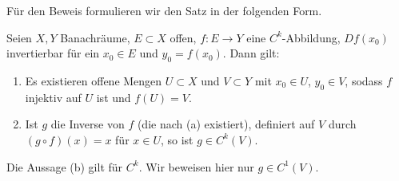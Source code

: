 \documentclass[11pt]{article}
\begin{document}
Für den Beweis formulieren wir den Satz in der folgenden Form.


\begin{theorem}\Theorem
  Seien $X, Y$ Banachräume, $E \subset X$ offen, $f\colon E \to Y$ eine $C^k$-Abbildung, $Df(x_0)$ invertierbar für ein $x_0 \in E$ und $y_0 = f(x_0)$. Dann gilt:
  \begin{enumerate}[label=(\alph*)]
    \item Es existieren offene Mengen $U \subset X$ und $V \subset Y$ mit $x_0 \in U$, $y_0 \in V$, sodass $f$ injektiv auf $U$ ist und $f(U) = V$.
    \item Ist $g$ die Inverse von $f$ (die nach (a) existiert), definiert auf $V$ durch $(g \circ f)(x) = x$ für $x \in U$, so ist $g \in C^k(V)$.
  \end{enumerate}
\end{theorem}


\begin{note}
  Die Aussage (b) gilt für $C^k$. Wir beweisen hier nur $g \in C^1(V)$.
\end{note}
\end{document}
